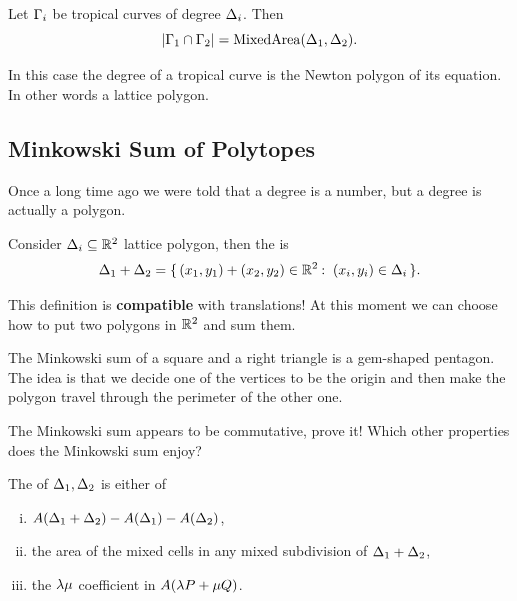\documentclass[12pt]{memoir}
\begin{document}
\begin{Th}
Let $\Gamma_i$ be tropical curves of degree $\Delta_i$. Then 
$$|\Gamma_1\cap\Gamma_2|=\operatorname{MixedArea}(\Delta_1,\Delta_2).$$
\end{Th}

In this case the degree of a tropical curve is the Newton polygon of its equation. In other words a lattice polygon.

\subsection{Minkowski Sum of Polytopes}

Once a long time ago we were told that a degree is a number, but a degree is actually a polygon.
\begin{Def}
    Consider $\Delta_i\subseteq\mathbb{R}^2$ lattice polygon, then the  is 
    $$\Dl_1+\Dl_2=\set{(x_1,y_1)+(x_2,y_2)\in\bR^2\:\ (x_i,y_i)\in\Dl_i}.$$
\end{Def}
This definition is \textbf{compatible} with translations! At this moment we can choose how to put two polygons in $\mathbb{R}^2$ and sum them. 

\begin{Ex}
    The Minkowski sum of a square and a right triangle is a gem-shaped pentagon. The idea is that we decide one of the vertices to be the origin and then make the polygon travel through the perimeter of the other one.
\end{Ex}

\begin{Ej}
The Minkowski sum appears to be commutative, prove it! Which other properties does the Minkowski sum enjoy?
\end{Ej}

\begin{Ex}
\end{Ex}

\begin{Def}
    The  of $\Delta_1,\Delta_2$ is either of 
    \begin{enumerate}[i)]
        \item $A(\Delta_1+\Delta_2)-A(\Delta_1)-A(\Delta_2)$,
        \item the area of the mixed cells in any mixed subdivision of $\Delta_1+\Delta_2$,
        \item the $\lambda\mu$ coefficient in $A(\lambda P+\mu Q)$.
    \end{enumerate}
\end{Def}
\end{document}
